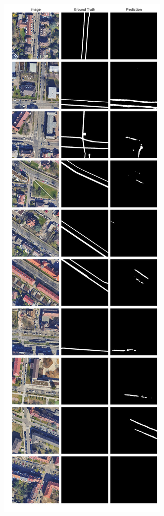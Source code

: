 	\begin{figure}
	\centering
	\begin{subfigure}{.4\textwidth}
		\centering
		\includegraphics[width=1.\textwidth]{Bilder/Samples-KA/dbunet-r.png} 

\end{subfigure}
\end{figure}
